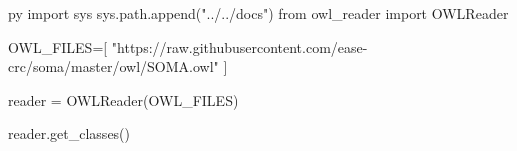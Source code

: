 \documentclass{article}
\begin{document}
\begin{pythontexcustomcode}{py}
import sys
sys.path.append("../../docs")
from owl_reader import OWLReader

OWL_FILES=[
    "https://raw.githubusercontent.com/ease-crc/soma/master/owl/SOMA.owl"
]

reader = OWLReader(OWL_FILES)
\end{pythontexcustomcode}

\begin{multicols}{2}

\begin{pycode}
reader.get_classes()
\end{pycode}

\end{multicols}
\end{document}

